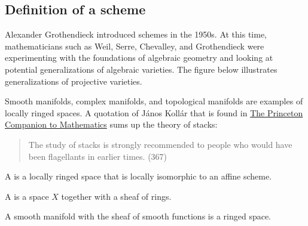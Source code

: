 \documentclass [11 pt, oneside] {article}
\begin{document}
\subsection{Definition of a scheme}
Alexander Grothendieck introduced schemes in the 1950s. At this time, mathematicians such as Weil, Serre, Chevalley, and Grothendieck were experimenting with the foundations of algebraic geometry and looking at potential generalizations of algebraic varieties. The figure below illustrates generalizations of projective varieties.
\begin{center}
\end{center}

Smooth manifolds, complex manifolds, and topological manifolds are examples of locally ringed spaces.
A quotation of János Kollár that is found in \ul{The Princeton Companion to Mathematics} sums up the theory of stacks: 
\begin{quote}
	\small 
	The study of stacks is strongly recommended to people who would have been flagellants in earlier times. (367)
\end{quote}

\begin{definition}[ ]\label{}\text{}
A  is a locally ringed space that is locally isomorphic to an affine scheme.
\end{definition}

\begin{definition}[ ]\label{}\text{}
A  is a space $X$ together with a sheaf of rings.
\end{definition}

\begin{example}\label{}\text{}
	A smooth manifold with the sheaf of smooth functions is a ringed space.
\end{example}
\end{document}
